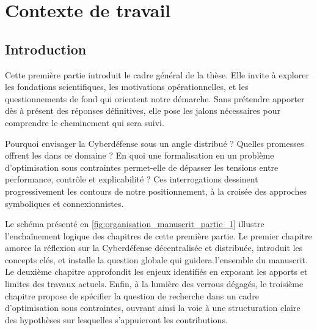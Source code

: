 \clearpage
\thispagestyle{empty}
\null
\newpage

\cleardoublepage
{}
\part{Contexte de travail}
\label{part:contexte}

\clearpage
\thispagestyle{empty}
\null
\newpage

\chapter*{Introduction}

\noindent
Cette première partie introduit le cadre général de la thèse. Elle invite à explorer les fondations scientifiques, les motivations opérationnelles, et les questionnements de fond qui orientent notre démarche. Sans prétendre apporter dès à présent des réponses définitives, elle pose les jalons nécessaires pour comprendre le cheminement qui sera suivi.

\medskip

\noindent
Pourquoi envisager la Cyberdéfense sous un angle distribué ? Quelles promesses offrent les  dans ce domaine ? En quoi une formalisation en un problème d'optimisation sous contraintes permet-elle de dépasser les tensions entre performance, contrôle et explicabilité ? Ces interrogations dessinent progressivement les contours de notre positionnement, à la croisée des approches symboliques et connexionnistes.

\medskip

\noindent
Le schéma présenté en \autoref{fig:organisation_manuscrit_partie_1} illustre l'enchaînement logique des chapitres de cette première partie. Le premier chapitre amorce la réflexion sur la Cyberdéfense décentralisée et distribuée, introduit les concepts clés, et installe la question globale qui guidera l'ensemble du manuscrit. Le deuxième chapitre approfondit les enjeux identifiés en exposant les apports et limites des travaux actuels. Enfin, à la lumière des verrous dégagés, le troisième chapitre propose de spécifier la question de recherche dans un cadre d'optimisation sous contraintes, ouvrant ainsi la voie à une structuration claire des hypothèses sur lesquelles s'appuieront les contributions.

